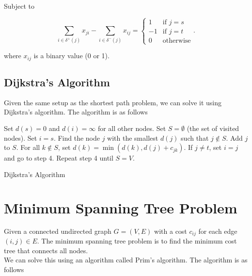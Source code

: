 \documentclass{report}
\begin{document}
Subject to

\[
	\sum_{i\in\delta^+(j)} x_{ji} - \sum_{i\in\delta^-(j)} x_{ij} = \begin{cases}
		1  & \text{if } j=s   \\
		-1 & \text{if } j=t   \\
		0  & \text{otherwise}
	\end{cases}
	.\]

where $x_{ij}$ is a binary value (0 or 1).

\subsection{Dijkstra's Algorithm}

Given the same setup as the shortest path problem, we can solve it using Dijkstra's algorithm. The algorithm is as follows

\begin{enumerate}
	\ii Set $d(s)=0$ and $d(i)=\infty$ for all other nodes.
	\ii Set $S=\emptyset$ (the set of visited nodes).
	\ii Set $i=s$.
	\ii Find the node $j$ with the smallest $d(j)$ such that $j\notin S$.
	\ii Add $j$ to $S$.
	\ii For all $k\notin S$, set $d(k)=\min(d(k),d(j)+c_{jk})$.
	\ii If $j\neq t$, set $i=j$ and go to step 4.
	\ii Repeat step 4 until $S=V$.
\end{enumerate}

\begin{algorithm}
	\SetAlgoLined
	\caption{Dijkstra's Algorithm}
\end{algorithm}

\newpage

\section{Minimum Spanning Tree Problem}

Given a connected undirected graph $G=(V,E)$ with a cost $c_{ij}$ for each edge $(i,j)\in E$. The minimum spanning tree problem is to find the minimum cost tree that connects all nodes.\\

We can solve this using an algorithm called Prim's algorithm. The algorithm is as follows
\end{document}
